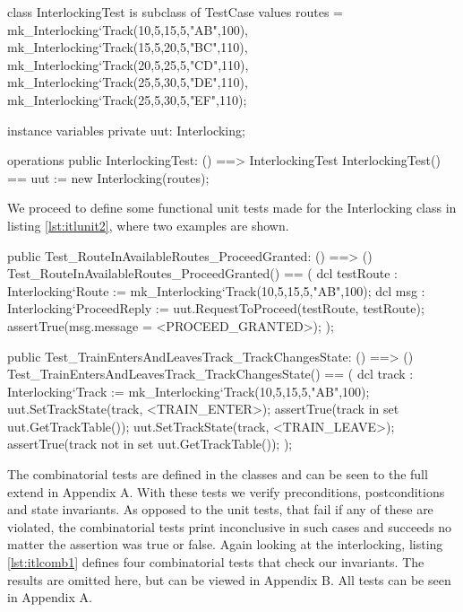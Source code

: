 \documentclass[preprint,12pt]{elsarticle}
\begin{document}
\begin{vdmsl}[label=lst:itlunit1,caption={The test uses some predefined values and initiates the UUT in the constructor.}]
	class InterlockingTest is subclass of TestCase
	values
	routes = {{mk_Interlocking`Track(10,5,15,5,"AB",100)},
		{mk_Interlocking`Track(15,5,20,5,"BC",110)},
		{mk_Interlocking`Track(20,5,25,5,"CD",110)},
		{mk_Interlocking`Track(25,5,30,5,"DE",110)},
		{mk_Interlocking`Track(25,5,30,5,"EF",110)}};
	
	instance variables
	private uut: Interlocking;

	operations
	public InterlockingTest: () ==> InterlockingTest
	InterlockingTest() ==
		uut := new Interlocking(routes);
\end{vdmsl}

We proceed to define some functional unit tests made for the Interlocking class in listing \ref{lst:itlunit2}, where two examples are shown.

\begin{vdmsl}[label=lst:itlunit2,caption={Two unit tests defined for the Interlocking class.}]
	public Test_RouteInAvailableRoutes_ProceedGranted: () ==> ()
	Test_RouteInAvailableRoutes_ProceedGranted() ==
	(
	dcl testRoute : Interlocking`Route
	 := {mk_Interlocking`Track(10,5,15,5,"AB",100)};
	dcl msg : Interlocking`ProceedReply
	 := uut.RequestToProceed(testRoute, testRoute);
	assertTrue(msg.message = <PROCEED_GRANTED>);
	);
	
	public Test_TrainEntersAndLeavesTrack_TrackChangesState: ()
	 ==> ()
	Test_TrainEntersAndLeavesTrack_TrackChangesState() ==
	(
	dcl track : Interlocking`Track
	 := mk_Interlocking`Track(10,5,15,5,"AB",100);
	uut.SetTrackState(track, <TRAIN_ENTER>);
	assertTrue(track in set uut.GetTrackTable());
	uut.SetTrackState(track, <TRAIN_LEAVE>);
	assertTrue(track not in set uut.GetTrackTable());
	);
\end{vdmsl}

The combinatorial tests are defined in the classes and can be seen to the full extend in Appendix A. With these tests we verify preconditions, postconditions and state invariants. As opposed to the unit tests, that fail if any of these are violated, the combinatorial tests print inconclusive in such cases and succeeds no matter the assertion was true or false. Again looking at the interlocking, listing \ref{lst:itlcomb1} defines four combinatorial tests that check our invariants. The results are omitted here, but can be viewed in Appendix B. All tests can be seen in Appendix A.
\end{document}
